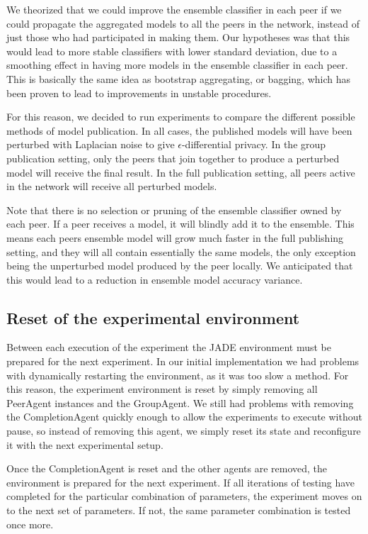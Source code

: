 We theorized that we could improve the ensemble classifier in each peer if we could propagate the aggregated models to all the peers in the network, instead of just those who had participated in making them. Our hypotheses was that this would lead to more stable classifiers with lower standard deviation, due to a smoothing effect in having more models in the ensemble classifier in each peer. This is basically the same idea as bootstrap aggregating, or bagging, which has been proven to lead to improvements in unstable procedures\citep{breiman1996bagging}. 

For this reason, we decided to run experiments to compare the different possible methods of model publication. In all cases, the published models will have been perturbed with Laplacian noise to give $\epsilon$-differential privacy. In the group publication setting, only the peers that join together to produce a perturbed model will receive the final result. In the full publication setting, all peers active in the network will receive all perturbed models. 

Note that there is no selection or pruning of the ensemble classifier owned by each peer. If a peer receives a model, it will blindly add it to the ensemble. This means each peers ensemble model will grow much faster in the full publishing setting, and they will all contain essentially the same models, the only exception being the unperturbed model produced by the peer locally. We anticipated that this would lead to a reduction in ensemble model accuracy variance.


\subsection{Reset of the experimental environment}

Between each execution of the experiment the JADE environment must be prepared for the next experiment. In our initial implementation we had problems with dynamically restarting the environment, as it was too slow a method. For this reason, the experiment environment is reset by simply removing all PeerAgent instances and the GroupAgent. We still had problems with removing the CompletionAgent quickly enough to allow the experiments to execute without pause, so instead of removing this agent, we simply reset its state and reconfigure it with the next experimental setup.

Once the CompletionAgent is reset and the other agents are removed, the environment is prepared for the next experiment. If all iterations of testing have completed for the particular combination of parameters, the experiment moves on to the next set of parameters. If not, the same parameter combination is tested once more.